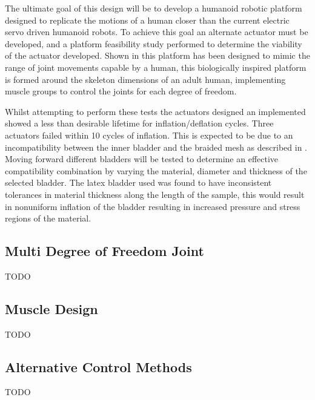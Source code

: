 \documentclass[11pt,a4paper]{article}
\begin{document}
The ultimate goal of this design  will be to develop a humanoid robotic platform designed to replicate the motions of a human closer than the current electric servo driven humanoid robots. To achieve this goal an alternate actuator must be developed, and a platform feasibility study performed to determine the viability of the actuator developed. Shown in  this platform has been designed to mimic the range of joint movements capable by a human, this biologically inspired platform is formed around the skeleton dimensions of an adult human, implementing muscle groups to control the joints for each degree of freedom. \newline

Whilst attempting to perform these tests the actuators designed an implemented showed a less than desirable lifetime for inflation/deflation cycles. Three actuators failed within 10 cycles of inflation. This is expected to be due to an incompatibility between the inner bladder and the braided mesh as described in \cite{andrikopoulos_nikolakopoulos_2017}. Moving forward different bladders will be tested to determine an effective compatibility combination by varying the material, diameter and thickness of the selected bladder. The latex bladder used was found to have inconsistent tolerances in material thickness along the length of the sample, this would result in nonuniform inflation of the bladder resulting in increased pressure and stress regions of the material.

\subsection{Multi Degree of Freedom Joint}
\label{sub:two_dof_joint}
TODO

\subsection{Muscle Design}
\label{sub:future_muscle_design}
TODO

\subsection{Alternative Control Methods}
\label{sub:alternative_control_methods}
TODO
\end{document}
